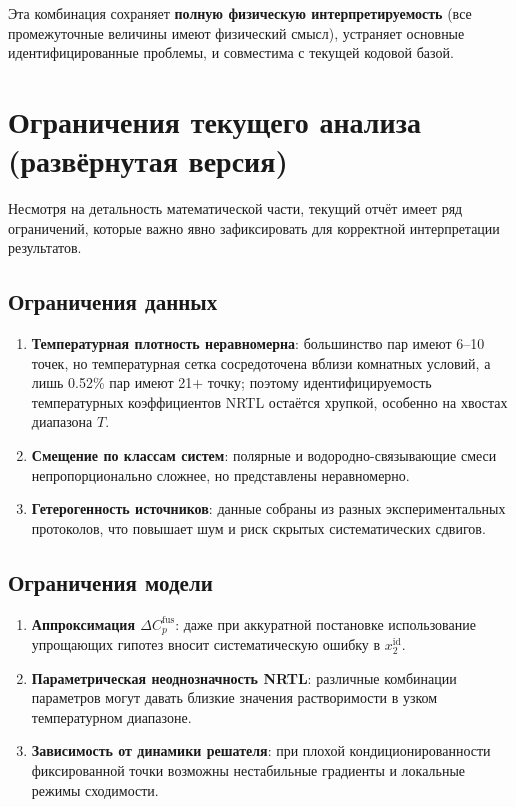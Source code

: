 \documentclass[11pt]{article}
\begin{document}
Эта комбинация сохраняет \textbf{полную физическую интерпретируемость} (все промежуточные величины имеют физический смысл), устраняет основные идентифицированные проблемы, и совместима с текущей кодовой базой.



\section{Ограничения текущего анализа (развёрнутая версия)}

Несмотря на детальность математической части, текущий отчёт имеет ряд ограничений, которые важно явно зафиксировать для корректной интерпретации результатов.

\subsection{Ограничения данных}

\begin{enumerate}
  \item \textbf{Температурная плотность неравномерна}: большинство пар имеют 6--10 точек, но температурная сетка сосредоточена вблизи комнатных условий, а лишь 0.52\% пар имеют 21+ точку; поэтому идентифицируемость температурных коэффициентов NRTL остаётся хрупкой, особенно на хвостах диапазона $T$.
  \item \textbf{Смещение по классам систем}: полярные и водородно-связывающие смеси непропорционально сложнее, но представлены неравномерно.
  \item \textbf{Гетерогенность источников}: данные собраны из разных экспериментальных протоколов, что повышает шум и риск скрытых систематических сдвигов.
\end{enumerate}

\subsection{Ограничения модели}

\begin{enumerate}
  \item \textbf{Аппроксимация $\Delta C_p^{\mathrm{fus}}$}: даже при аккуратной постановке использование упрощающих гипотез вносит систематическую ошибку в $x_2^{\mathrm{id}}$.
  \item \textbf{Параметрическая неоднозначность NRTL}: различные комбинации параметров могут давать близкие значения растворимости в узком температурном диапазоне.
  \item \textbf{Зависимость от динамики решателя}: при плохой кондиционированности фиксированной точки возможны нестабильные градиенты и локальные режимы сходимости.
\end{enumerate}
\end{document}
